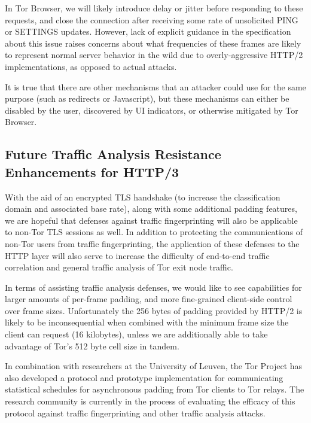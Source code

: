 \documentclass[letterpaper,11pt]{llncs}
\begin{document}
In Tor Browser, we will likely introduce delay or jitter before responding to
these requests, and close the connection after receiving some rate of
unsolicited PING or SETTINGS updates. However, lack of explicit guidance in
the specification about this issue raises concerns about what frequencies of
these frames are likely to represent normal server behavior in the wild due to
overly-aggressive HTTP/2 implementations, as opposed to actual attacks.

It is true that there are other mechanisms that an attacker could use for the
same purpose (such as redirects or Javascript), but these mechanisms can
either be disabled by the user, discovered by UI indicators, or otherwise
mitigated by Tor Browser.

\subsection{Future Traffic Analysis Resistance Enhancements for HTTP/3}

With the aid of an encrypted TLS handshake (to increase the classification
domain and associated base rate), along with some additional padding features,
we are hopeful that defenses against traffic fingerprinting will also be
applicable to non-Tor TLS sessions as well. In addition to protecting the
communications of non-Tor users from traffic fingerprinting, the application
of these defenses to the HTTP layer will also serve to increase the difficulty
of end-to-end traffic correlation and general traffic analysis of Tor exit
node traffic.

In terms of assisting traffic analysis defenses, we would like to see
capabilities for larger amounts of per-frame padding, and more fine-grained
client-side control over frame sizes. Unfortunately the 256 bytes of padding
provided by HTTP/2 is likely to be inconsequential when combined with the
minimum frame size the client can request (16 kilobytes), unless we are
additionally able to take advantage of Tor's 512 byte cell size in tandem.

In combination with researchers at the University of Leuven, the Tor Project
has also developed a protocol\cite{multihop-padding} and prototype
implementation\cite{wfpadtools} for communicating statistical schedules for
asynchronous padding from Tor clients to Tor relays.  The research community
is currently in the process of evaluating the efficacy of this protocol
against traffic fingerprinting and other traffic analysis attacks.
\end{document}
